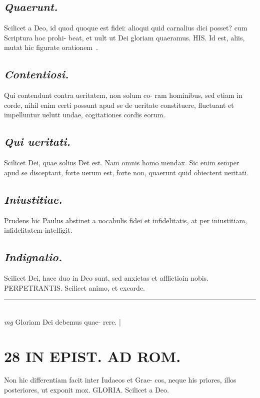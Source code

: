 \documentclass{article}
\begin{document}
\begin{pages}
\subsection*{\textit{Quaerunt. }}\pstart Scilicet a Deo, id quod quoque est fidei: alioqui quid carnalius dici posset? cum Scriptura hoc prohi- beat, et uult ut Dei gloriam quaeramus. HIS. Id est, aliis, mutat hic figurate orationem .   \pend
{}
{}
\subsection*{\textit{Contentiosi. }}\pstart Qui contendunt contra ueritatem, non solum co- ram hominibus, sed etiam in corde, nihil enim certi possunt apud se de ueritate constituere, fluctuant et impelluntur uelutt undae, cogitationes cordis eorum.   \pend
{}
{}
\subsection*{\textit{Qui ueritati. }}\pstart Scilicet Dei, quae solius Det est. Nam omnis homo mendax. Sic enim semper apud se disceptant, forte uerum est, forte non, quaerunt quid obiectent ueritati.   \pend
{}
{}
\subsection*{\textit{Iniustitiae. }}\pstart Prudens hic Paulus abstinet a uocabulis fidei et infidelitatis, at per iniustitiam, infidelitatem intelligit.   \pend
{}
{}
\subsection*{\textit{Indignatio. }}\pstart Scilicet Dei, haec duo in Deo sunt, sed anxietas et afflictioin nobis. PERPETRANTIS.  Scilicet animo, et excorde.   \pend
\vspace{0.5cm}\noindent
\vspace{0.2cm}\rule{1cm}{0.2pt}\\ 
\hspace{0.2cm}\textit{mg}
\footnotesize Gloriam Dei debemus quae- rere.  
\normalsize| 
\section*{28 IN EPIST. AD ROM.  }
\marginpar{[ p.]}\pstart Non hic differentiam facit inter Iudaeos et Grae- cos, neque his priores, illos posteriores, ut exponit mox. GLORIA. Scilicet a Deo.   \pend
{}
{}

\end{pages}
\end{document}
